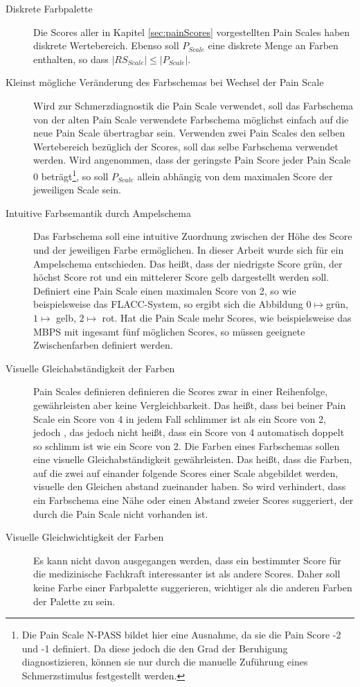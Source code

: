 \begin{description}
\item[Diskrete Farbpalette] Die Scores aller in Kapitel \ref{sec:painScores} vorgestellten Pain Scales haben diskrete Wertebereich. Ebenso soll $P_{Scale}$ eine diskrete Menge an Farben enthalten, so dass $|RS_{Scale}| \leq |P_{Scale}|$.
\item[Kleinst mögliche Veränderung des Farbschemas bei Wechsel der Pain Scale] Wird zur Schmerzdiagnostik die Pain Scale verwendet, soll das Farbschema von der alten Pain Scale verwendete Farbschema möglichst einfach auf die neue Pain Scale übertragbar sein. Verwenden zwei Pain Scales den selben Wertebereich bezüglich der Scores, soll das selbe Farbschema verwendet werden. Wird angenommen, dass der geringste Pain Score jeder Pain Scale 0 beträgt\footnote{Die Pain Scale N-PASS bildet hier eine Ausnahme, da sie die Pain Score -2 und -1 definiert. Da diese jedoch die den Grad der Beruhigung diagnostizieren, können sie nur durch die manuelle Zuführung eines Schmerzstimulus festgestellt werden.}, so soll $P_{Scale}$ allein abhängig von dem maximalen Score der jeweiligen Scale sein. 
\item[Intuitive Farbsemantik durch Ampelschema] Das Farbschema soll eine intuitive Zuordnung zwischen der Höhe des Score und der jeweiligen Farbe ermöglichen. In dieser Arbeit wurde sich für ein Ampelschema entschieden. Das heißt, dass der niedrigste Score \glqq grün\grqq{}, der höchst Score \glqq rot\grqq{} und ein \glqq mittelerer\grqq{} Score \glqq gelb\grqq{} dargestellt werden soll. Definiert eine Pain Scale einen maximalen Score von 2, so wie beispielsweise das FLACC-System, so ergibt sich die Abbildung $0 \mapsto $grün, $1 \mapsto $ gelb, $2 \mapsto $ rot. Hat die Pain Scale mehr Scores, wie beispielsweise das MBPS mit ingesamt fünf möglichen Scores, so müssen geeignete Zwischenfarben definiert werden.
\item[Visuelle Gleichabständigkeit der Farben] Pain Scales definieren definieren die Scores zwar in einer Reihenfolge, gewährleisten aber keine Vergleichbarkeit. Das heißt, dass bei beiner Pain Scale ein Score von 4 in jedem Fall schlimmer ist als ein Score von 2, jedoch , das jedoch nicht heißt, dass ein Score von 4 automatisch doppelt so schlimm ist wie ein Score von 2. Die Farben eines Farbschemas sollen eine visuelle Gleichabständigkeit gewährleisten. Das heißt, dass die Farben, auf die zwei auf einander folgende Scores einer Scale abgebildet werden, visuelle den Gleichen abstand zueinander haben. So wird verhindert, dass ein Farbschema eine Nähe oder einen Abstand zweier Scores suggeriert, der durch die Pain Scale nicht vorhanden ist. 
\item[Visuelle Gleichwichtigkeit der Farben] Es kann nicht davon ausgegangen werden, dass ein bestimmter Score für die medizinische Fachkraft interessanter ist als andere Scores. Daher soll keine Farbe einer Farbpalette suggerieren, wichtiger als die anderen Farben der Palette zu sein.
\end{description}


